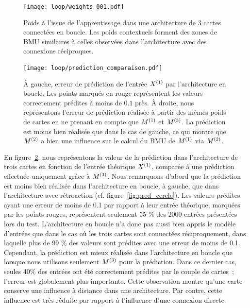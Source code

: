 \documentclass[../main]{subfiles}
\begin{document}
\begin{figure}
	\centering\texttt{[image: loop/weights\_001.pdf]}
	\caption{Poids à l'issue de l'apprentissage dans une architecture de 3 cartes connectées en boucle. Les poids contextuels forment des zones de BMU similaires à celles observées dans l'architecture avec des connexions réciproques.\label{fig:3som_loop}}
\end{figure}
\begin{figure}
	\centering\texttt{[image: loop/prediction\_comparaison.pdf]}
	\caption{\`A gauche, erreur de prédiction de l'entrée $X^{({1})}$ par l'architecture en boucle. Les points marqués en rouge représentent les valeurs correctement prédites à moins de $0.1$ près. 
	\`A droite, nous représentons l'erreur de prédiction réalisée à partir des mêmes poids de cartes en ne prenant en compte que $M^{({1})}$ et $M^{({3})}$. La prédiction est moins bien réalisée que dans le cas de gauche, ce qui montre que $M^{({2})}$ a bien une influence sur le calcul du BMU de $M^{({1})}$ via $M^{({2})}$.
	\label{fig:pred_loop}}
\end{figure}

En figure~\ref{fig:pred_loop}, nous représentons la valeur de la prédiction dans l'architecture de trois cartes en fonction de l'entrée théorique $X^{({1})}$, comparée à une prédiction effectuée uniquement grâce à $M^{({3})}$.
Nous remarquons d'abord que la prédiction est moins bien réalisée dans l'architecture en boucle, à gauche, que dans l'architecture avec rétroaction (cf. figure~\ref{fig:pred_cercle}).
Les valeurs prédites ayant une erreur de moins de 0.1 par rapport à leur entrée théorique, marquées par les points rouges, représentent seulement 55 \% des 2000 entrées présentées lors du test.
L'architecture en boucle n'a donc pas aussi bien appris le modèle d'entrées que dans le cas où les trois cartes sont connectées réciproquement, dans laquelle plus de 99 \% des valeurs sont prédites avec une erreur de moins de 0.1.
Cependant, la prédiction est mieux réalisée dans l'architecture en boucle que lorsque nous utilisons seulement $M^{({3})}$ pour la prédiction.
Dans ce dernier cas, seules 40\% des entrées ont été correctement prédites par le couple de cartes~; l'erreur est globalement plus importante.
Cette observation montre qu'une carte conserve une influence à distance dans une architecture. Par contre, cette influence est très réduite par rapport à l'influence d'une connexion directe.
\end{document}
